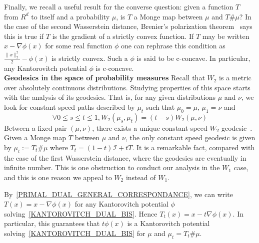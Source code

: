 \documentclass[runningheads]{llncs}
\newcommand{\id}{\mathcal{I}}
\begin{document}
Finally, we recall a useful result for the converse question: given a function $T$ from $R^d$ to itself and a probability $\mu$, is $T$ a Monge map between $\mu$ and $T\#\mu$? In the case of the second Wasserstein distance, Brenier's polarization theorem~\citep{brenier1991polar} says this is true if $T$ is the gradient of a strictly convex function. If $T$ may be written $x-\nabla \phi(x)$ for some real function $\phi$ one can rephrase this condition as $\frac{\|x\|_2^2}{2}-\phi(x)$ is strictly convex. Such a $\phi$ is said to be c-concave. In particular, any Kantorovitch potential $\phi$ is c-concave.\\

\textbf{Geodesics in the space of probability measures}
Recall that $W_2$ is a metric over absolutely continuous distributions. Studying properties of this space starts with the analysis of its geodesics. That is, for any given distributions $\mu$ and  $\nu$, we look for constant speed paths described by $\mu_t$ such that $\mu_0=\mu$, $\mu_1=\nu$ and
\[\forall 0\leqslant s \leqslant t\leqslant1, W_2(\mu_s,\mu_t)=(t-s)W_2(\mu,\nu) \]
Between a fixed pair $(\mu,\nu)$, there exists a unique constant-speed $W_2$ geodesic~\citep{Villani}. Given a Monge map $T$ between $\mu$ and $\nu$, the only constant speed geodesic is given by $\mu_t:=T_t\#\mu$ where $T_t=(1-t)\id+tT$. It is a remarkable fact, compared with the case of the first Wasserstein distance, where the geodesics are eventually in infinite number. This is one obstruction to conduct our analysis in the $W_1$ case, and this is one reason we appeal to $W_2$ instead of $W_1$.

By~\eqref{PRIMAL_DUAL_GENERAL_CORRESPONDANCE}, we can write $T(x)=x-\nabla \phi(x)$ for any Kantorovitch potential $\phi$ solving~\eqref{KANTOROVITCH_DUAL_BIS}. Hence $T_t(x)=x-t\nabla\phi(x)$. In particular, this guarantees that $t\phi(x)$ is a Kantorovitch potential solving~\eqref{KANTOROVITCH_DUAL_BIS} for $\mu$ and $\mu_t=T_t\#\mu$.
\end{document}
